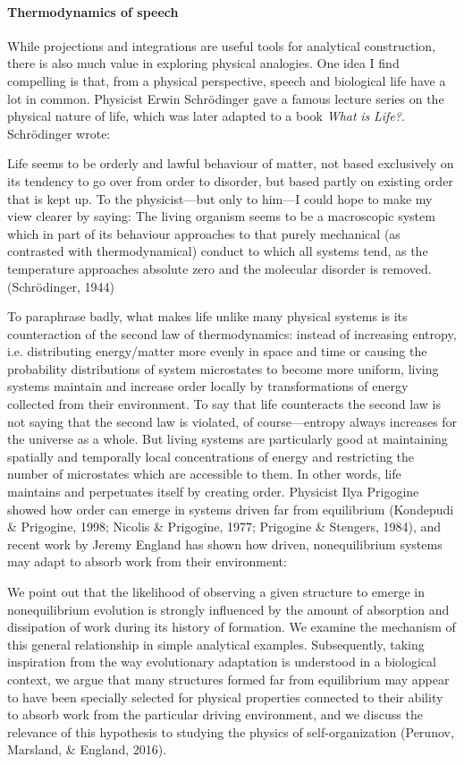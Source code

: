 \paragraph{Thermodynamics of speech}

While projections and integrations are useful tools for analytical construction, there is also much value in exploring physical analogies. One idea I find compelling is that, from a physical perspective, speech and biological life have a lot in common. Physicist Erwin Schrödinger gave a famous lecture series on the physical nature of life, which was later adapted to a book \textit{What} \textit{is} \textit{Life?}. Schrödinger wrote:

Life seems to be orderly and lawful behaviour of matter, not based exclusively on its tendency to go over from order to disorder, but based partly on existing order that is kept up. To the physicist—but only to him—I could hope to make my view clearer by saying: The living organism seems to be a macroscopic system which in part of its behaviour approaches to that purely mechanical (as contrasted with thermodynamical) conduct to which all systems tend, as the temperature approaches absolute zero and the molecular disorder is removed. (Schrödinger, 1944)

  To paraphrase badly, what makes life unlike many physical systems is its counteraction of the second law of thermodynamics: instead of increasing entropy, i.e. distributing energy/matter more evenly in space and time or causing the probability distributions of system microstates to become more uniform, living systems maintain and increase order locally by transformations of energy collected from their environment. To say that life counteracts the second law is not saying that the second law is violated, of course—entropy always increases for the universe as a whole. But living systems are particularly good at maintaining spatially and temporally local concentrations of energy and restricting the number of microstates which are accessible to them. In other words, life maintains and perpetuates itself by creating order. Physicist Ilya Prigogine showed how order can emerge in systems driven far from equilibrium (Kondepudi \& Prigogine, 1998; Nicolis \& Prigogine, 1977; Prigogine \& Stengers, 1984), and recent work by Jeremy England has shown how driven, nonequilibrium systems may adapt to absorb work from their environment:

We point out that the likelihood of observing a given structure to emerge in nonequilibrium evolution is strongly influenced by the amount of absorption and dissipation of work during its history of formation. We examine the mechanism of this general relationship in simple analytical examples. Subsequently, taking inspiration from the way evolutionary adaptation is understood in a biological context, we argue that many structures formed far from equilibrium may appear to have been specially selected for physical properties connected to their ability to absorb work from the particular driving environment, and we discuss the relevance of this hypothesis to studying the physics of self-organization (Perunov, Marsland, \& England, 2016).

